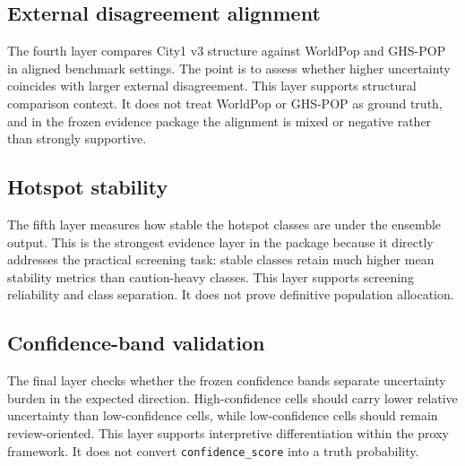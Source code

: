 \subsection{External disagreement alignment}

The fourth layer compares City1 v3 structure against WorldPop and GHS-POP in aligned benchmark settings. The point is to assess whether higher uncertainty coincides with larger external disagreement. This layer supports structural comparison context. It does not treat WorldPop or GHS-POP as ground truth, and in the frozen evidence package the alignment is mixed or negative rather than strongly supportive.

\subsection{Hotspot stability}

The fifth layer measures how stable the hotspot classes are under the ensemble output. This is the strongest evidence layer in the package because it directly addresses the practical screening task: stable classes retain much higher mean stability metrics than caution-heavy classes. This layer supports screening reliability and class separation. It does not prove definitive population allocation.

\subsection{Confidence-band validation}

The final layer checks whether the frozen confidence bands separate uncertainty burden in the expected direction. High-confidence cells should carry lower relative uncertainty than low-confidence cells, while low-confidence cells should remain review-oriented. This layer supports interpretive differentiation within the proxy framework. It does not convert \texttt{confidence\_score} into a truth probability.


